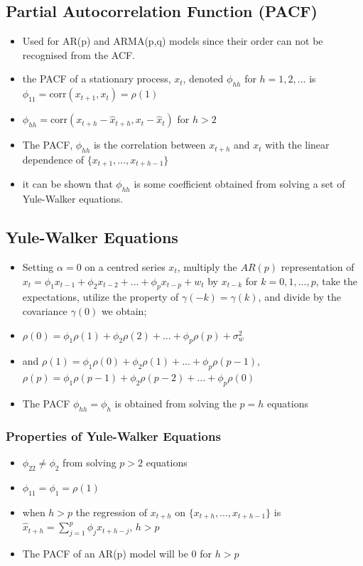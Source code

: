 \documentclass{article}
\begin{document}
\subsection{Partial Autocorrelation Function (PACF)}
\begin{itemize}
    \item Used for AR(p) and ARMA(p,q) models since their order can not be recognised from the ACF.
    \item the PACF of a stationary process, $x_t$, denoted $\phi_{hh}$ for $h = 1,2,...$ is $\phi_{11} = \text{corr}(x_{t+1},x_t) = \rho(1)$
    \item $\phi_{hh} = \text{corr}(x_{t+h} - \hat{x}_{t+h}, x_t - \hat{x}_t)$ for $h >2$
    \item The PACF, $\phi_{hh}$ is the correlation between $x_{t+h}$ and $x_t$ with the linear dependence of $\{ x_{t+1}, ..., x_{t+h-1} \}$
    \item it can be shown that $\phi_{hh}$ is some coefficient obtained from solving a set of Yule-Walker equations.
\end{itemize}


\subsection{Yule-Walker Equations}

\begin{itemize}
    \item Setting $\alpha =0$ on a centred series $x_t$, multiply the $AR(p)$ representation of $x_t = \phi_1 x_{t-1} + \phi_2 x_{t-2} + ...+ \phi_p x_{t-p} + w_t$ by $x_{t-k}$ for $k = 0,1,...,p$, take the expectations, utilize the property of $\gamma(-k) = \gamma(k)$, and divide by the covariance $\gamma(0)$ we obtain;
    \item $\rho(0) = \phi_1 \rho(1) + \phi_2 \rho(2) + ... + \phi_p \rho(p) + \sigma^2_w$
    \item and $\rho(1) = \phi_1 \rho(0) + \phi_2 \rho(1) + ... + \phi_p \rho(p-1)$, $\rho(p) = \phi_1 \rho(p-1) + \phi_2 \rho(p-2) + ... + \phi_p \rho(0)$
    \item The PACF $\phi_{hh} = \phi_h$ is obtained from solving the $ p = h$ equations
\end{itemize}

\subsubsection{Properties of Yule-Walker Equations}
\begin{itemize}
    \item $\phi_{22} \neq \phi_2$ from solving $p > 2$ equations
    \item $\phi_{11} = \phi_1 = \rho(1)$
    \item when $h > p$ the regression of $x_{t+h}$ on $\{x_{t+h},...,x_{t+h-1}  \}$ is $\hat{x}_{t+h} = \sum_{j=1}^p \phi_j x_{t+h-j}$, $h > p$
    \item The PACF of an AR(p) model will be 0 for $h >p$
\end{itemize}
\end{document}
